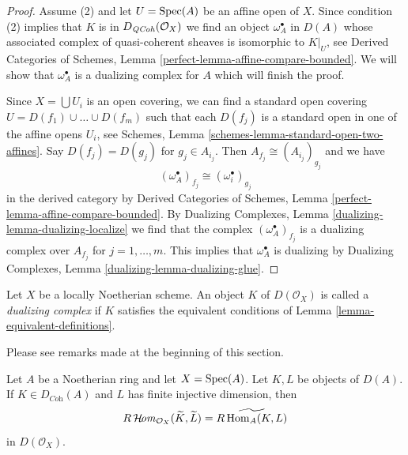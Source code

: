 \begin{proof}
Assume (2) and let $U = \mathop{\mathrm{Spec}}(A)$ be an affine open of $X$.
Since condition (2) implies that $K$ is in $D_{\mathit{QCoh}}(\mathcal{O}_X)$
we find an object $\omega_A^\bullet$ in $D(A)$ whose associated
complex of quasi-coherent sheaves is isomorphic to $K|_U$, see
Derived Categories of Schemes, Lemma
\ref{perfect-lemma-affine-compare-bounded}.
We will show that $\omega_A^\bullet$ is a dualizing complex for $A$
which will finish the proof.

\medskip\noindent
Since $X = \bigcup U_i$ is an open covering, we can find a standard
open covering $U = D(f_1) \cup \ldots \cup D(f_m)$ such that
each $D(f_j)$ is a standard open in one of the affine opens $U_i$, see
Schemes, Lemma \ref{schemes-lemma-standard-open-two-affines}.
Say $D(f_j) = D(g_j)$ for $g_j \in A_{i_j}$.
Then $A_{f_j} \cong (A_{i_j})_{g_j}$ and we have
$$
(\omega_A^\bullet)_{f_j} \cong (\omega_i^\bullet)_{g_j}
$$
in the derived category by
Derived Categories of Schemes, Lemma
\ref{perfect-lemma-affine-compare-bounded}.
By Dualizing Complexes, Lemma \ref{dualizing-lemma-dualizing-localize}
we find that
the complex $(\omega_A^\bullet)_{f_j}$ is a dualizing complex over
$A_{f_j}$ for $j = 1, \ldots, m$. This implies that $\omega_A^\bullet$
is dualizing by
Dualizing Complexes, Lemma \ref{dualizing-lemma-dualizing-glue}.
\end{proof}

\begin{definition}
\label{definition-dualizing-scheme}
Let $X$ be a locally Noetherian scheme. An object $K$ of
$D(\mathcal{O}_X)$ is called a {\it dualizing complex} if
$K$ satisfies the equivalent conditions of
Lemma \ref{lemma-equivalent-definitions}.
\end{definition}

\noindent
Please see remarks made at the beginning of this section.

\begin{lemma}
\label{lemma-affine-duality}
Let $A$ be a Noetherian ring and let $X = \mathop{\mathrm{Spec}}(A)$. Let $K, L$ be objects
of $D(A)$. If $K \in D_{\textit{Coh}}(A)$ and $L$ has finite injective
dimension, then
$$
R\mathop{\mathcal{H}\!\mathit{om}}\nolimits_{\mathcal{O}_X}(\widetilde{K}, \widetilde{L})
=
\widetilde{R\mathop{\mathrm{Hom}}\nolimits_A(K, L)}
$$
in $D(\mathcal{O}_X)$.
\end{lemma}

